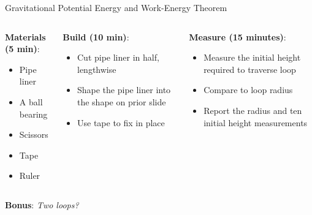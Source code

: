\documentclass{beamer}
\begin{document}
\begin{frame}{Gravitational Potential Energy and Work-Energy Theorem}
\small
\begin{columns}[T]
\begin{column}{0.33\textwidth}
\textbf{Materials (5 min)}:
\begin{itemize}
\item Pipe liner
\item A ball bearing
\item Scissors
\item Tape
\item Ruler
\end{itemize}
\end{column}
\begin{column}{0.33\textwidth}
\textbf{Build (10 min)}:
\begin{itemize}
\item Cut pipe liner in half, lengthwise
\item Shape the pipe liner into the shape on prior slide
\item Use tape to fix in place
\end{itemize}
\end{column}
\begin{column}{0.33\textwidth}
\textbf{Measure (15 minutes)}:
\begin{itemize}
\item Measure the initial height required to traverse loop
\item Compare to loop radius
\item Report the radius and ten initial height measurements
\end{itemize}
\end{column}
\end{columns}
\alert{\textbf{Bonus}: \textit{Two loops?}}
\end{frame}
\end{document}
